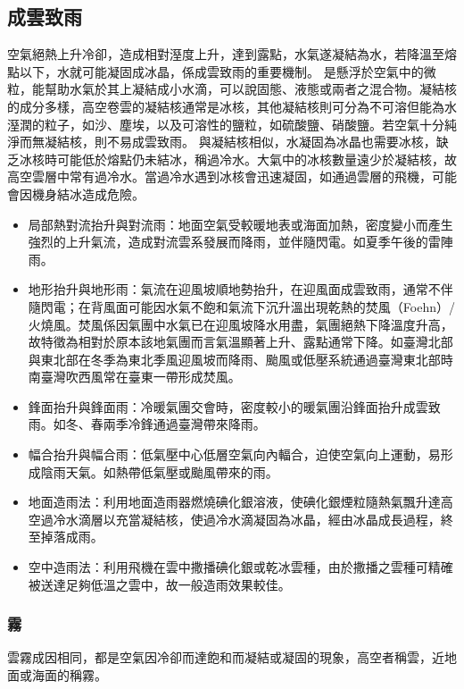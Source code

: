 \documentclass[a4paper,12pt]{report}
\begin{document}
\subsection{成雲致雨}
空氣絕熱上升冷卻，造成相對溼度上升，達到露點，水氣遂凝結為水，若降溫至熔點以下，水就可能凝固成冰晶，係成雲致雨的重要機制。
是懸浮於空氣中的微粒，能幫助水氣於其上凝結成小水滴，可以說固態、液態或兩者之混合物。凝結核的成分多樣，高空卷雲的凝結核通常是冰核，其他凝結核則可分為不可溶但能為水溼潤的粒子，如沙、塵埃，以及可溶性的鹽粒，如硫酸鹽、硝酸鹽。若空氣十分純淨而無凝結核，則不易成雲致雨。
與凝結核相似，水凝固為冰晶也需要冰核，缺乏冰核時可能低於熔點仍未結冰，稱過冷水。大氣中的冰核數量遠少於凝結核，故高空雲層中常有過冷水。當過冷水遇到冰核會迅速凝固，如通過雲層的飛機，可能會因機身結冰造成危險。
\begin{itemize}
\item 局部熱對流抬升與對流雨：地面空氣受較暖地表或海面加熱，密度變小而產生強烈的上升氣流，造成對流雲系發展而降雨，並伴隨閃電。如夏季午後的雷陣雨。
\item 地形抬升與地形雨：氣流在迎風坡順地勢抬升，在迎風面成雲致雨，通常不伴隨閃電；在背風面可能因水氣不飽和氣流下沉升溫出現乾熱的焚風（Foehn）/火燒風。焚風係因氣團中水氣已在迎風坡降水用盡，氣團絕熱下降溫度升高，故特徵為相對於原本該地氣團而言氣溫顯著上升、露點通常下降。如臺灣北部與東北部在冬季為東北季風迎風坡而降雨、颱風或低壓系統通過臺灣東北部時南臺灣吹西風常在臺東一帶形成焚風。
\item 鋒面抬升與鋒面雨：冷暖氣團交會時，密度較小的暖氣團沿鋒面抬升成雲致雨。如冬、春兩季冷鋒通過臺灣帶來降雨。
\item 幅合抬升與幅合雨：低氣壓中心低層空氣向內輻合，迫使空氣向上運動，易形成陰雨天氣。如熱帶低氣壓或颱風帶來的雨。
\end{itemize}
\begin{itemize}
\item 地面造雨法：利用地面造雨器燃燒碘化銀溶液，使碘化銀煙粒隨熱氣飄升達高空過冷水滴層以充當凝結核，使過冷水滴凝固為冰晶，經由冰晶成長過程，終至掉落成雨。
\item 空中造雨法：利用飛機在雲中撒播碘化銀或乾冰雲種，由於撒播之雲種可精確被送達足夠低溫之雲中，故一般造雨效果較佳。
\end{itemize}
\subsubsection{霧}
雲霧成因相同，都是空氣因冷卻而達飽和而凝結或凝固的現象，高空者稱雲，近地面或海面的稱霧。
\end{document}
